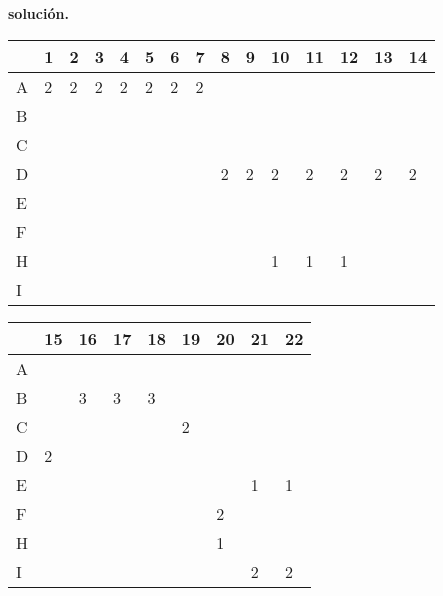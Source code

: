 \documentclass[a4paper,11pt]{article}
\begin{document}
\textbf{solución.}
\begin{table}[h]
\begin{tabular}{l|l|l|l|l|l|l|l|l|l|l|l|l|l|l|}
\cline{2-15}
                        & 1 & 2 & 3 & 4 & 5 & 6 & 7 & 8 & 9 & 10 & 11 & 12 & 13 & 14 \\ \hline
\multicolumn{1}{|l|}{A} & 2 & 2 & 2 & 2 & 2 & 2 & 2 &   &   &    &    &    &    &    \\ \hline
\multicolumn{1}{|l|}{B} &   &   &   &   &   &   &   &   &   &    &    &    &    &    \\ \hline
\multicolumn{1}{|l|}{C} &   &   &   &   &   &   &   &   &   &    &    &    &    &    \\ \hline
\multicolumn{1}{|l|}{D} &   &   &   &   &   &   &   & 2 & 2 & 2  & 2  & 2  & 2  & 2  \\ \hline
\multicolumn{1}{|l|}{E} &   &   &   &   &   &   &   &   &   &    &    &    &    &    \\ \hline
\multicolumn{1}{|l|}{F} &   &   &   &   &   &   &   &   &   &    &    &    &    &    \\ \hline
\multicolumn{1}{|l|}{H} &   &   &   &   &   &   &   &   &   & 1  & 1  & 1  &    &    \\ \hline
\multicolumn{1}{|l|}{I} &   &   &   &   &   &   &   &   &   &    &    &    &    &    \\ \hline
\end{tabular}
\end{table}

\begin{table}[h]
\begin{tabular}{l|l|l|l|l|l|l|l|l|}
\cline{2-9}
                        & 15 & 16 & 17 & 18 & 19 & 20 & 21 & 22 \\ \hline
\multicolumn{1}{|l|}{A} &    &    &    &    &    &    &    &    \\ \hline
\multicolumn{1}{|l|}{B} &    & 3  & 3  & 3  &    &    &    &    \\ \hline
\multicolumn{1}{|l|}{C} &    &    &    &    & 2  &    &    &    \\ \hline
\multicolumn{1}{|l|}{D} & 2  &    &    &    &    &    &    &    \\ \hline
\multicolumn{1}{|l|}{E} &    &    &    &    &    &    & 1  & 1  \\ \hline
\multicolumn{1}{|l|}{F} &    &    &    &    &    & 2  &    &    \\ \hline
\multicolumn{1}{|l|}{H} &    &    &    &    &    & 1  &    &    \\ \hline
\multicolumn{1}{|l|}{I} &    &    &    &    &    &    & 2  & 2  \\ \hline
\end{tabular}
\end{table}
\end{document}
